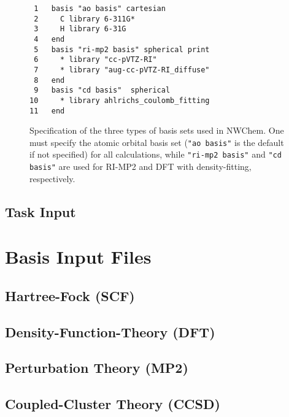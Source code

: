\documentclass[letterpaper,12pt]{article}
\begin{document}
\begin{figure}
    \caption{Specification of the three types of basis sets used in NWChem.  One must specify the atomic orbital basis set (\texttt{"ao basis"} is the default if not specified) for all calculations, while \texttt{"ri-mp2 basis"} and \texttt{"cd basis"} are used for RI-MP2 and DFT with density-fitting, respectively.}
    \label{fig:BasisLibrary}
    \begin{verbatim}
 1   basis "ao basis" cartesian
 2     C library 6-311G*
 3     H library 6-31G
 4   end
 5   basis "ri-mp2 basis" spherical print
 6     * library "cc-pVTZ-RI"
 7     * library "aug-cc-pVTZ-RI_diffuse"
 8   end
 9   basis "cd basis"  spherical
10     * library ahlrichs_coulomb_fitting
11   end
    \end{verbatim}
\end{figure}

\newpage

\subsection{Task Input}\label{sec:TaskInput}

\newpage

\section{Basis Input Files}\label{sec:BasisInputFiles}

\newpage

\subsection{Hartree-Fock (SCF)}\label{sec:HartreeFock}

\newpage

\subsection{Density-Function-Theory (DFT)}\label{sec:DensityFunctionTheory}

\newpage

\subsection{Perturbation Theory (MP2)}\label{sec:PerturbationTheory}

\newpage

\subsection{Coupled-Cluster Theory (CCSD)}\label{sec:CoupledClusterTheory}
\end{document}
